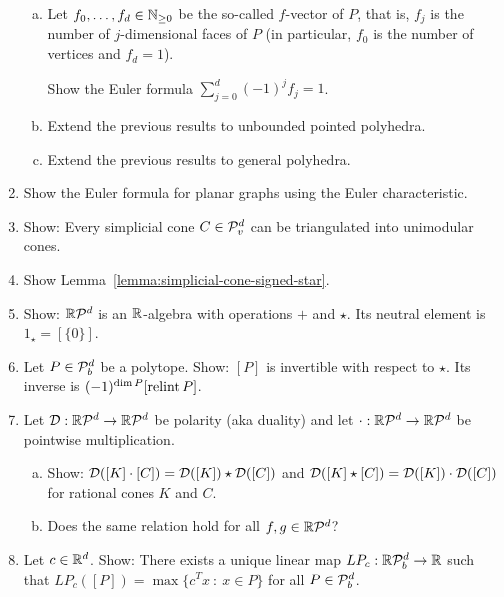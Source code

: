 \begin{enumerate}
\begin{enumerate}[(a)]
      \item Let $f_0, \ldots, f_d \in \mathbb{N}_{\geq 0}$ be the so-called $f$-vector of $P$, that is,
        $f_j$ is the number of $j$-dimensional faces of $P$ (in particular, $f_0$ is the number of vertices and $f_d = 1$).

        Show the Euler formula $\sum_{j = 0}^d (-1)^j f_j = 1$.

      \item Extend the previous results to unbounded pointed polyhedra.

      \item Extend the previous results to general polyhedra.
    \end{enumerate}

  \item Show the Euler formula for planar graphs using the Euler characteristic.

  \item Show: Every simplicial cone $C \in \mathcal{P}_v^d$ can be triangulated into unimodular cones.

  \item Show Lemma~\ref{lemma:simplicial-cone-signed-star}.

  \item Show: $\mathbb{R} \mathcal{P}^d$ is an $\mathbb{R}$-algebra with operations $+$ and $\star$.
    Its neutral element is $1_\star = [\{0\}]$.

  \item Let $P \in \mathcal{P}_b^d$ be a polytope. Show: $[P]$ is invertible with respect to $\star$.
    Its inverse is $(-1)^{\dim P} [\operatorname{relint} P]$.

  \item Let $\mathcal{D} : \mathbb{R} \mathcal{P}^d \to \mathbb{R} \mathcal{P}^d$ be polarity (aka duality) and let $\cdot : \mathbb{R} \mathcal{P}^d \to \mathbb{R} \mathcal{P}^d$ be pointwise multiplication.
    \begin{enumerate}[(a)]
      \item
        Show: $\mathcal{D}([K] \cdot [C]) = \mathcal{D}([K]) \star \mathcal{D}([C])$ and $\mathcal{D}([K] \star [C]) = \mathcal{D}([K]) \cdot \mathcal{D}([C])$ for rational cones $K$ and $C$.

      \item
        Does the same relation hold for all $f, g \in \mathbb{R} \mathcal{P}^d$?
    \end{enumerate}

  \item Let $c \in \mathbb{R}^d$.
    Show: There exists a unique linear map $LP_c: \mathbb{R} \mathcal{P}_b^d \to \mathbb{R}$
    such that $LP_c([P]) = \max\{ c^Tx ~:~ x \in P \}$ for all $P \in \mathcal{P}_b^d$.
\end{enumerate}
